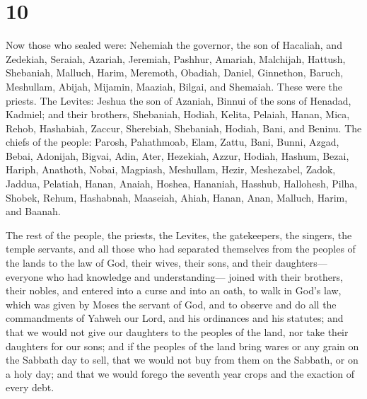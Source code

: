 \hypertarget{section-9}{%
\section{10}\label{section-9}}

 Now those who sealed were: Nehemiah the governor, the son
of Hacaliah, and Zedekiah,  Seraiah, Azariah, Jeremiah,
 Pashhur, Amariah, Malchijah,  Hattush,
Shebaniah, Malluch,  Harim, Meremoth, Obadiah, 
Daniel, Ginnethon, Baruch,  Meshullam, Abijah, Mijamin,
 Maaziah, Bilgai, and Shemaiah. These were the priests.
 The Levites: Jeshua the son of Azaniah, Binnui of the sons
of Henadad, Kadmiel;  and their brothers, Shebaniah,
Hodiah, Kelita, Pelaiah, Hanan,  Mica, Rehob, Hashabiah,
 Zaccur, Sherebiah, Shebaniah,  Hodiah, Bani,
and Beninu.  The chiefs of the people: Parosh, Pahathmoab,
Elam, Zattu, Bani,  Bunni, Azgad, Bebai, 
Adonijah, Bigvai, Adin,  Ater, Hezekiah, Azzur,
 Hodiah, Hashum, Bezai,  Hariph, Anathoth,
Nobai,  Magpiash, Meshullam, Hezir, 
Meshezabel, Zadok, Jaddua,  Pelatiah, Hanan, Anaiah,
 Hoshea, Hananiah, Hasshub,  Hallohesh, Pilha,
Shobek,  Rehum, Hashabnah, Maaseiah,  Ahiah,
Hanan, Anan,  Malluch, Harim, and Baanah.

 The rest of the people, the priests, the Levites, the
gatekeepers, the singers, the temple servants, and all those who had
separated themselves from the peoples of the lands to the law of God,
their wives, their sons, and their daughters---everyone who had
knowledge and understanding---  joined with their brothers,
their nobles, and entered into a curse and into an oath, to walk in
God's law, which was given by Moses the servant of God, and to observe
and do all the commandments of Yahweh our Lord, and his ordinances and
his statutes;  and that we would not give our daughters to
the peoples of the land, nor take their daughters for our sons;
 and if the peoples of the land bring wares or any grain on
the Sabbath day to sell, that we would not buy from them on the Sabbath,
or on a holy day; and that we would forego the seventh year crops and
the exaction of every debt.

